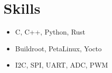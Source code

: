 \section*{Skills}
\begin{itemize}[itemsep=-0.5em]
    \item C, C++, Python, Rust
    \item Buildroot, PetaLinux, Yocto
    \item I2C, SPI, UART, ADC, PWM
\end{itemize}
